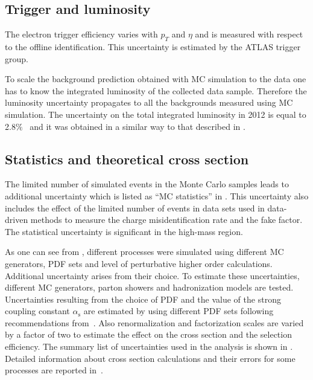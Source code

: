 \subsection{Trigger and luminosity}
The electron trigger efficiency varies with $p_T$ and $\eta$ and is measured with respect to the offline identification. This uncertainty is estimated by the ATLAS trigger group.

To scale the background prediction obtained with MC simulation to the data 
one has to know the integrated luminosity of the collected data sample. 
Therefore the luminosity uncertainty propagates to all the backgrounds measured using MC simulation.
The uncertainty on the total integrated luminosity in 2012 is equal to 2.8$\%$~\cite{Aad:2013ucp} 
and it was obtained in a similar way to that described in .

\subsection{Statistics and theoretical cross section}
The limited number of simulated events in the Monte Carlo samples leads to additional uncertainty which is listed as ``MC statistics'' in .
This uncertainty also includes the effect of the limited number of events in data sets used in data-driven methods to measure the charge misidentification rate and the fake factor.
The statistical uncertainty is significant in the high-mass region.

As one can see from , different processes were simulated using different MC generators, PDF sets and level of perturbative higher order calculations.
Additional uncertainty arises from  their choice.
To estimate these uncertainties, different MC generators, parton showers and hadronization models are tested.
Uncertainties resulting from the choice of PDF and the value of the strong coupling constant $\alpha_{\mathrm{s}}$ are
estimated by using different PDF sets following recommendations from~\cite{pdf4lhc}.
Also renormalization and factorization scales are varied by a factor of two to estimate the effect on the cross section and the selection efficiency.
The summary list of uncertainties used in the analysis is shown in .
Detailed information about cross section calculations and their errors for some processes 
are reported in~\cite{diboson_cross_section,ttW_cross_section,ttV_cross_section}.

